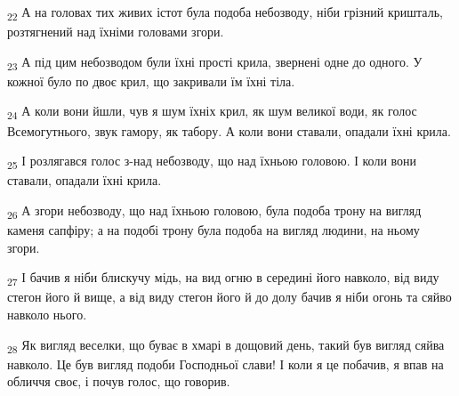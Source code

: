 \begin{tcolorbox}
\textsubscript{22} А на головах тих живих істот була подоба небозводу, ніби грізний кришталь, розтягнений над їхніми головами згори.
\end{tcolorbox}
\begin{tcolorbox}
\textsubscript{23} А під цим небозводом були їхні прості крила, звернені одне до одного. У кожної було по двоє крил, що закривали їм їхні тіла.
\end{tcolorbox}
\begin{tcolorbox}
\textsubscript{24} А коли вони йшли, чув я шум їхніх крил, як шум великої води, як голос Всемогутнього, звук гамору, як табору. А коли вони ставали, опадали їхні крила.
\end{tcolorbox}
\begin{tcolorbox}
\textsubscript{25} І розлягався голос з-над небозводу, що над їхньою головою. І коли вони ставали, опадали їхні крила.
\end{tcolorbox}
\begin{tcolorbox}
\textsubscript{26} А згори небозводу, що над їхньою головою, була подоба трону на вигляд каменя сапфіру; а на подобі трону була подоба на вигляд людини, на ньому згори.
\end{tcolorbox}
\begin{tcolorbox}
\textsubscript{27} І бачив я ніби блискучу мідь, на вид огню в середині його навколо, від виду стегон його й вище, а від виду стегон його й до долу бачив я ніби огонь та сяйво навколо нього.
\end{tcolorbox}
\begin{tcolorbox}
\textsubscript{28} Як вигляд веселки, що буває в хмарі в дощовий день, такий був вигляд сяйва навколо. Це був вигляд подоби Господньої слави! І коли я це побачив, я впав на обличчя своє, і почув голос, що говорив.
\end{tcolorbox}
